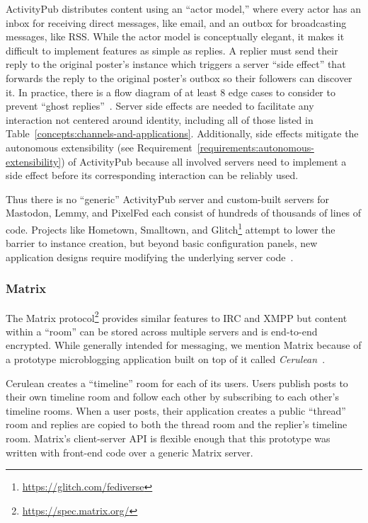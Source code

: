 ActivityPub distributes content using an ``actor model,''
where every actor has an inbox for receiving direct messages, like email,
and an outbox for broadcasting messages, like RSS.
While the actor model is conceptually elegant, it makes it difficult
to implement features as simple as replies.
A replier must send their reply to the original poster's instance which
triggers a server ``side effect'' that forwards the reply to the original
poster's outbox so their followers can discover it.
In practice, there is a flow diagram of at least 8 edge cases to consider
to prevent ``ghost replies''~\cite{stateofmastodon}.
Server side effects are needed to facilitate any interaction not centered around identity,
including all of those listed in Table~\ref{concepts:channels-and-applications}.
Additionally, side effects mitigate the autonomous extensibility
(see Requirement~\ref{requirements:autonomous-extensibility})
of ActivityPub
because all involved servers need to implement a side effect before
its corresponding interaction can be reliably used.

Thus there is no ``generic'' ActivityPub server
and custom-built servers
for Mastodon, Lemmy, and PixelFed each consist of hundreds
of thousands of lines of code.
Projects like Hometown, Smalltown, and Glitch\footnote{
    \url{https://glitch.com/fediverse}
} attempt to lower the barrier
to instance creation, but beyond basic configuration panels,
new application designs require modifying the underlying server code~\cite{smalltown,runyourownsocial}.

\subsubsection{Matrix}

The Matrix protocol\footnote{
    \url{https://spec.matrix.org/}
}
provides similar features to IRC and XMPP but content within a ``room''
can be stored across multiple servers and is end-to-end encrypted.
While generally intended for messaging, we mention Matrix because of a
prototype microblogging application built on top of it called \emph{Cerulean}~\cite{cerulean}.

Cerulean creates a ``timeline'' room for each of its users.
Users publish posts to their own timeline room
and follow each other by subscribing to each other's timeline rooms.
When a user posts, their application creates a
public ``thread'' room and replies are copied to both the
thread room and the replier's timeline room.
Matrix's client-server API is flexible enough that this prototype
was written with front-end code over a generic Matrix server.

